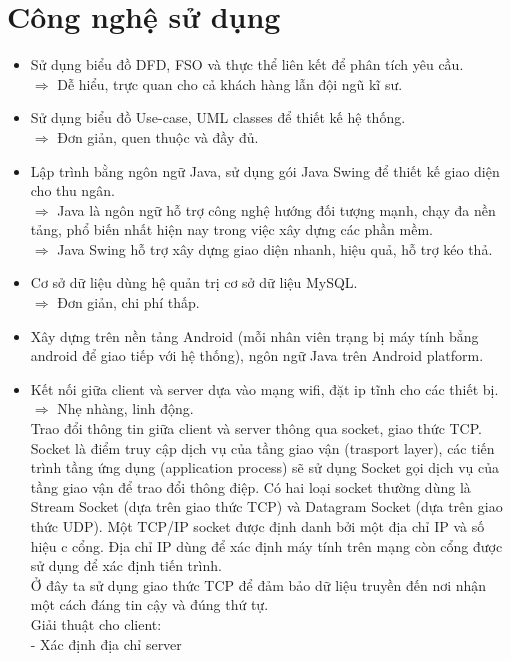 \documentclass[a4paper,12pt]{report}
\begin{document}
\section{Công nghệ sử dụng}
\begin{itemize}
	\item Sử dụng biểu đồ DFD, FSO và thực thể liên kết để phân tích yêu cầu.
	\\$\Rightarrow$ Dễ hiểu, trực quan cho cả khách hàng lẫn đội ngũ kĩ sư.
	\item Sử dụng biểu đồ Use-case, UML classes để thiết kế hệ thống.
	\\$\Rightarrow$ Đơn giản, quen thuộc và đầy đủ.
	\item Lập trình bằng ngôn ngữ Java, sử dụng gói Java Swing để thiết kế giao diện cho thu ngân.
	\\$\Rightarrow$ Java là ngôn ngữ hỗ trợ công nghệ hướng đối tượng mạnh, chạy đa nền tảng, phổ biến nhất hiện nay trong việc xây dựng các phần mềm.
	\\$\Rightarrow$ Java Swing hỗ trợ xây dựng giao diện nhanh, hiệu quả, hỗ trợ kéo thả.
	\item Cơ sở dữ liệu dùng hệ quản trị cơ sở dữ liệu MySQL.
	\\$\Rightarrow$ Đơn giản, chi phí thấp.
	\item Xây dựng trên nền tảng Android (mỗi nhân viên trạng bị máy tính bẳng android để giao tiếp với hệ thống), ngôn ngữ Java trên Android platform.
	\item Kết nối giữa client và server dựa vào mạng wifi, đặt ip tĩnh cho các thiết bị.
	\\$\Rightarrow$ Nhẹ nhàng, linh động.
	\\ Trao đổi thông tin giữa client và server thông qua socket, giao thức TCP.
	\\ Socket là điểm truy cập dịch vụ của tầng giao vận (trasport layer), các tiến trình tầng ứng dụng (application process) sẽ sử dụng Socket gọi dịch vụ của tầng giao vận để trao đổi thông điệp. Có hai loại socket thường dùng là Stream Socket (dựa trên giao thức TCP) và Datagram Socket (dựa trên giao thức UDP). Một TCP/IP socket được định danh bởi một địa chỉ IP và số hiệu c cổng. Địa chỉ IP dùng để xác định máy tính trên mạng còn cổng được sử dụng để xác định tiến trình.
	\\ Ở đây ta sử dụng giao thức TCP để đảm bảo dữ liệu truyền đến nơi nhận một cách đáng tin cậy và đúng thứ tự.
	\\ Giải thuật cho client:
	\\ \hspace*{3mm} - Xác định địa chỉ server

\end{itemize}
\end{document}
